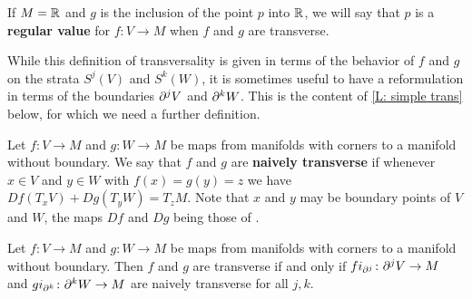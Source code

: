 \begin{definition}\label{D: regular value}
If $M = \mathbb{R}$ and $g$ is the inclusion of the point $p$ into $\mathbb{R}$, we will say that $p$ is a \textbf{regular value} for $f \colon V \to M$ when $f$ and $g$ are transverse.
\end{definition}

While this definition of transversality is given in terms of the behavior of $f$ and $g$ on the strata $S^j(V)$ and $S^k(W)$, it is sometimes useful to have a reformulation in terms of the boundaries $\partial^j V$ and $\partial^kW$.
This is the content of \cref{L: simple trans} below, for which we need a further definition.

\begin{definition}\label{D: naive transversality}
Let $f \colon V \to M$ and $g \colon W \to M$ be maps from manifolds with corners to a manifold without boundary.
We say that $f$ and $g$ are \textbf{naively transverse} if whenever $x \in V$ and $y\in W$ with $f(x) = g(y) = z$ we have $Df(T_xV)+Dg(T_yW) = T_z M$. Note that $x$ and $y$ may be boundary points of $V$ and $W$, the maps $Df$ and $Dg$ being those of \cite[Definition 3.2]{Joy12}.
\end{definition}

\begin{comment}
To be explicit in the case that $x \in V-S^0(V)$ or $y \in W-S^0(W)$ with $f(x) = g(y)$, let $(U_x,\phi_x)$ and $(U_y,\phi_y)$ be charts with $\phi_x(0) = x$ and $\phi_y(0) = y$.
By definition of smoothness, there exist neighborhoods $N_x$ and $N_y$ of $0$ in $\R^v$ and $\R^w$, respectively, so that $f\phi_x$ and $g\phi_y$ extend to smooth maps $\psi_x \colon N_x \to M$ and $\psi_y \colon N_y \to M$.
Then $f$ and $g$ are naively transverse at $x$ and $y$ if $D\psi_x(T_0 \R^v)+D\psi_y(T_0\R^w) = T_{f(x)}M$.
This property is independent of the involved choices as $D\psi_x(T_0 \R^v)$ is the limit of $D\psi_x(T_{a} \R^v)$ for $a$ taken along any smooth path in $U_x$, and this does not depend on the choice of $N_x$ or $\psi_x$, and similarly for $\psi_y$.
\end{comment}

\begin{lemma}\label{L: simple trans}
	Let $f \colon V \to M$ and $g \colon W \to M$ be maps from manifolds with corners to a manifold without boundary.
	Then $f$ and $g$ are transverse if and only if $fi_{\partial^j} \colon \partial^jV \to M$ and $gi_{\partial^k} \colon \partial^kW \to M$ are naively transverse for all $j,k$.
\end{lemma}

